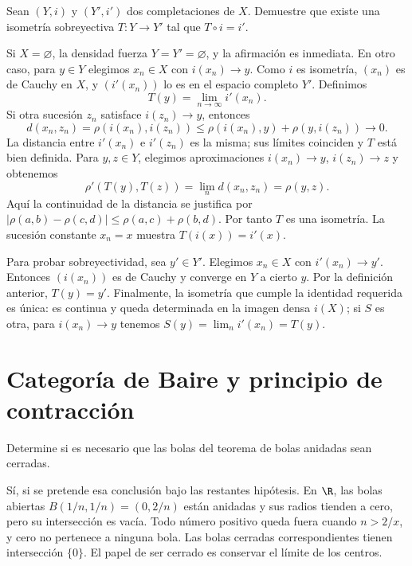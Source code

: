 \begin{ejercicio}\label{ej:lectura-9-1}\label{ch09:unicidad}
Sean $(Y,i)$ y $(Y',i')$ dos completaciones de $X$. Demuestre que existe una isometría sobreyectiva $T:Y\to Y'$ tal que $T\circ i=i'$.
\end{ejercicio}
\begin{solucion}
Si $X=\varnothing$, la densidad fuerza $Y=Y'=\varnothing$, y la afirmación es inmediata. En otro caso, para $y\in Y$ elegimos $x_n\in X$ con $i(x_n)\to y$. Como $i$ es isometría, $(x_n)$ es de Cauchy en $X$, y $(i'(x_n))$ lo es en el espacio completo $Y'$. Definimos
\[
 T(y)=\lim_{n\to\infty}i'(x_n).
\]
Si otra sucesión $z_n$ satisface $i(z_n)\to y$, entonces
\[
 d(x_n,z_n)=\rho(i(x_n),i(z_n))
 \leq\rho(i(x_n),y)+\rho(y,i(z_n))\longrightarrow0.
\]
La distancia entre $i'(x_n)$ e $i'(z_n)$ es la misma; sus límites coinciden y $T$ está bien definida. Para $y,z\in Y$, elegimos aproximaciones $i(x_n)\to y$, $i(z_n)\to z$ y obtenemos
\[
 \rho'(T(y),T(z))=\lim_nd(x_n,z_n)=\rho(y,z).
\]
Aquí la continuidad de la distancia se justifica por $|\rho(a,b)-\rho(c,d)|\leq\rho(a,c)+\rho(b,d)$. Por tanto $T$ es una isometría. La sucesión constante $x_n=x$ muestra $T(i(x))=i'(x)$.

Para probar sobreyectividad, sea $y'\in Y'$. Elegimos $x_n\in X$ con $i'(x_n)\to y'$. Entonces $(i(x_n))$ es de Cauchy y converge en $Y$ a cierto $y$. Por la definición anterior, $T(y)=y'$. Finalmente, la isometría que cumple la identidad requerida es única: es continua y queda determinada en la imagen densa $i(X)$; si $S$ es otra, para $i(x_n)\to y$ tenemos $S(y)=\lim_ni'(x_n)=T(y)$.
\end{solucion}

\chapter{Categoría de Baire y principio de contracción}

\begin{ejercicio}\label{ej:lectura-10-1}
Determine si es necesario que las bolas del teorema de bolas anidadas sean cerradas.
\end{ejercicio}
\begin{solucion}
Sí, si se pretende esa conclusión bajo las restantes hipótesis. En $\R$, las bolas abiertas $B(1/n,1/n)=(0,2/n)$ están anidadas y sus radios tienden a cero, pero su intersección es vacía. Todo número positivo queda fuera cuando $n>2/x$, y cero no pertenece a ninguna bola. Las bolas cerradas correspondientes tienen intersección $\{0\}$. El papel de ser cerrado es conservar el límite de los centros.
\end{solucion}

